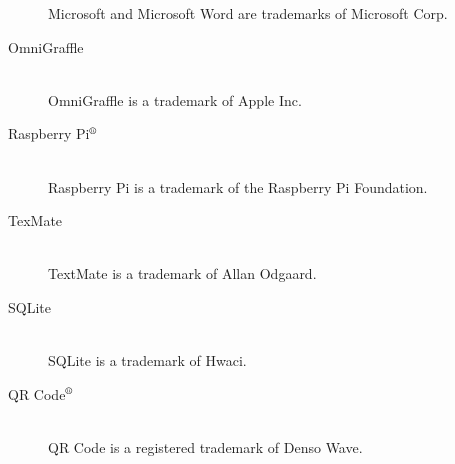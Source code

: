 \begin{description}
		 Microsoft and Microsoft Word are trademarks of Microsoft Corp.
	\item[OmniGraffle]\hfill \\
		OmniGraffle is a trademark of Apple Inc.
	\item[Raspberry Pi$\textsuperscript{\textregistered}$]\hfill \\
		Raspberry Pi is a trademark of the Raspberry Pi Foundation.
	\item[TexMate]\hfill \\
		TextMate is a trademark of Allan Odgaard.
	\item[SQLite]\hfill \\
		SQLite is a trademark of Hwaci.
	\item[QR Code$\textsuperscript{\textregistered}$]\hfill \\
		QR Code is a registered trademark of Denso Wave.
\end{description}